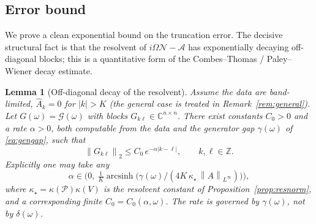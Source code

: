 \documentclass{amsart}
\newtheorem{lemma}{Lemma}
\theoremstyle{definition}
\newcommand{\C}{\mathbb{C}}
\newcommand{\Z}{\mathbb{Z}}
\newcommand{\norm}[1]{\left\lVert#1\right\rVert}
\newcommand{\Acal}{\mathcal{A}}
\newcommand{\Ncal}{\mathcal{N}}
\begin{document}
\subsection{Error bound}
We prove a clean exponential bound on the truncation error. The decisive
structural fact is that the resolvent of $i\Omega\Ncal-\Acal$ has
exponentially decaying off-diagonal blocks; this is a quantitative form of the
Combes--Thomas / Paley--Wiener decay estimate.

\begin{lemma}[Off-diagonal decay of the resolvent]\label{lem:decay}
Assume the data are \emph{band-limited}, $\hat A_k=0$ for $|k|>K$ (the general
case is treated in Remark~\ref{rem:general}). Let
$G(\omega)=\mathcal G(\omega)$ with blocks $G_{k\ell}\in\C^{n\times n}$. There
exist constants $C_0>0$ and a rate $\alpha>0$, both computable from the data
and the \emph{generator gap} $\gamma(\omega)$ of \eqref{eq:gengap}, such that
\begin{equation}\label{eq:decay}
\norm{G_{k\ell}}_2\le C_0\,e^{-\alpha|k-\ell|},\qquad k,\ell\in\Z .
\end{equation}
Explicitly one may take any
\begin{equation}\label{eq:alpharange}
\alpha\in\Big(0,\ \tfrac1K\operatorname{arcsinh}\!\big(\gamma(\omega)/(4K\,\kappa_\star\,\norm{A}_{L^\infty})\big)\Big),
\end{equation}
where $\kappa_\star=\kappa(\mathcal P)\kappa(V)$ is the resolvent constant of
Proposition~\ref{prop:resnorm}, and a corresponding finite $C_0=C_0(\alpha,\omega)$.
The rate is governed by $\gamma(\omega)$, \emph{not} by $\delta(\omega)$.
\end{lemma}
\end{document}
